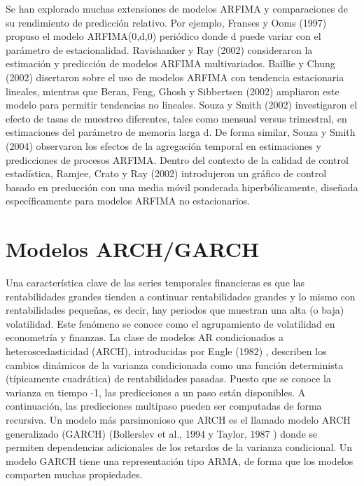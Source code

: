 \documentclass{llncs}
\begin{document}
Se han explorado muchas extensiones de modelos ARFIMA y comparaciones de su rendimiento de predicción relativo. Por ejemplo, Franses y Ooms (1997) \cite{Franses1997117} propuso el modelo ARFIMA(0,d,0) periódico donde d puede variar con el parámetro de estacionalidad. Ravishanker y Ray (2002) \cite{Ravishanker2002207} consideraron la estimación y predicción de modelos ARFIMA multivariados. Baillie y Chung (2002) \cite{Baillie2002215} disertaron sobre el uso de modelos ARFIMA con tendencia estacionaria lineales, mientras que Beran, Feng, Ghosh y Sibbertsen (2002) \cite{Beran2002227} ampliaron este modelo para permitir tendencias no lineales. Souza y Smith (2002) investigaron el efecto de tasas de muestreo diferentes, tales como mensual versus trimestral, en estimaciones del parámetro de memoria larga d. De forma similar, Souza y Smith (2004) observaron los efectos de la agregación temporal en estimaciones y predicciones de procesos ARFIMA. Dentro del contexto de la calidad de control estadística, Ramjee, Crato y Ray (2002)\cite{Ramjee2002291} introdujeron un gráfico de control basado en preducción con una media móvil ponderada hiperbólicamente, diseñada específicamente para modelos ARFIMA no estacionarios.


\section{Modelos ARCH/GARCH}
Una característica clave de las series temporales financieras es que las rentabilidades grandes tienden a continuar rentabilidades grandes y lo mismo con rentabilidades pequeñas, es decir, hay periodos que muestran una alta (o baja) volatilidad. Este fenómeno se conoce como el agrupamiento de volatilidad en econometría y finanzas. La clase de modelos AR condicionados a heteroscedasticidad (ARCH), introducidas por Engle (1982) \cite{Engle1982987}, describen los cambios dinámicos de la varianza condicionada como una función determinista (típicamente cuadrática) de rentabilidades pasadas. Puesto que se conoce la varianza en tiempo -1, las predicciones a un paso están disponibles. A continuación, las predicciones multipaso pueden ser computadas de forma recursiva. Un modelo más parsimonioso que ARCH es el llamado modelo ARCH generalizado (GARCH) (Bollerslev et al., 1994\cite{Bollerslev19942959} y Taylor, 1987 \cite{Taylor1987159}) donde se permiten dependencias adicionales de los retardos de la varianza condicional. Un modelo GARCH tiene una representación tipo ARMA, de forma que los modelos comparten muchas propiedades.
\end{document}
